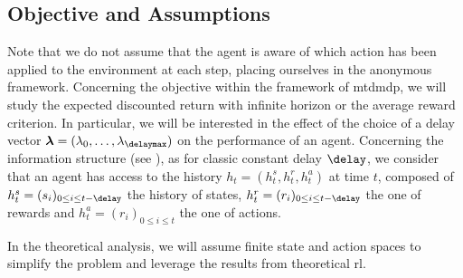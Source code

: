 \subsection{Objective and Assumptions}
Note that we do not assume that the agent is aware of which action has been applied to the environment at each step, placing ourselves in the anonymous framework. 
Concerning the objective within the framework of \gls{mtdmdp}, we will study the expected discounted return with infinite horizon or the average reward criterion.
In particular, we will be interested in the effect of the choice of a delay vector $\boldsymbol\lambda=(\lambda_0,\dots,\lambda_\delaymax)$ on the performance of an agent. 
Concerning the information structure (see ), as for classic constant delay $\delay$, we consider that an agent has access to the history $h_t = (h^s_t,h^r_t,h^a_t)$ at time $t$, composed of $h^s_t = (s_i)_{0\le i\le t-\delay}$ the history of states, $h^r_t = (r_i)_{0\le i\le t-\delay}$ the one of rewards and $h^a_t = (r_i)_{0\le i\le t}$ the one of actions. 

In the theoretical analysis, we will assume finite state and action spaces to simplify the problem and leverage the results from theoretical \gls{rl}. 

 
